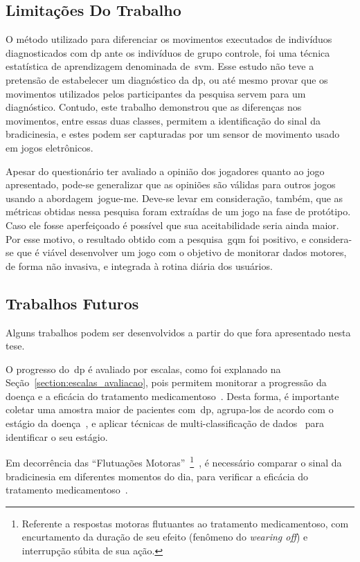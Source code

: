 \subsection{Limitações Do Trabalho}\label{sec:limitacoes}

O método utilizado para diferenciar os movimentos executados de indivíduos diagnosticados com \ac{dp} ante os indivíduos de grupo controle, foi uma técnica estatística de aprendizagem denominada de~\ac{svm}. Esse estudo não teve a pretensão de estabelecer um diagnóstico da \ac{dp}, ou até mesmo provar que os movimentos utilizados pelos participantes da pesquisa servem para um diagnóstico. Contudo, este trabalho demonstrou que as diferenças nos movimentos, entre essas duas classes, permitem a identificação do sinal da bradicinesia, e estes podem ser capturadas por um sensor de movimento usado em jogos eletrônicos. 

Apesar do questionário ter avaliado a opinião dos jogadores quanto ao jogo apresentado, pode-se generalizar que as opiniões são válidas para outros jogos usando a abordagem~\ac{jogue-me}. Deve-se levar em consideração, também, que as métricas obtidas nessa pesquisa foram extraídas de um jogo na fase de protótipo. Caso ele fosse aperfeiçoado é possível que sua aceitabilidade seria ainda maior. Por esse motivo, o resultado obtido com a pesquisa~\ac{gqm} foi positivo, e considera-se que é viável desenvolver um jogo com o objetivo de monitorar dados motores, de forma não invasiva, e integrada à rotina diária dos usuários.


\subsection{Trabalhos Futuros}\label{sec:trab_futuros}

Alguns trabalhos podem ser desenvolvidos a partir do que fora apresentado nesta tese.

O progresso do~\ac{dp} é avaliado por escalas, como foi explanado na Seção~\ref{section:escalas_avaliacao}, pois permitem monitorar a progressão da doença e a eficácia do tratamento medicamentoso~\cite{updrs87,goul05}. Desta forma, é importante coletar uma amostra maior de pacientes com~\ac{dp}, agrupa-los de acordo com o estágio da doença~\cite{goul05}, e aplicar técnicas de multi-classificação de dados~\cite{multisvm2011} para identificar o seu estágio.

Em decorrência das ``Flutuações Motoras''~\footnote{Referente a respostas motoras flutuantes ao tratamento medicamentoso, com encurtamento da duração de seu efeito (fenômeno do \textit{wearing off}) e interrupção súbita de sua ação.}~\cite{protpar010},  é necessário comparar o sinal da bradicinesia em diferentes momentos do dia, para verificar a eficácia do tratamento medicamentoso~\cite{protpar010}.

